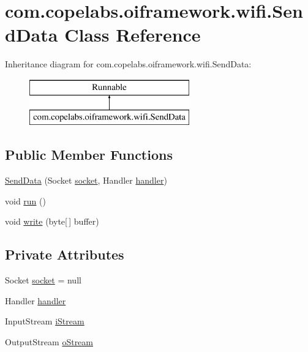 \hypertarget{classcom_1_1copelabs_1_1oiframework_1_1wifi_1_1_send_data}{}\section{com.\+copelabs.\+oiframework.\+wifi.\+Send\+Data Class Reference}
\label{classcom_1_1copelabs_1_1oiframework_1_1wifi_1_1_send_data}
Inheritance diagram for com.\+copelabs.\+oiframework.\+wifi.\+Send\+Data\+:\begin{figure}[H]
\begin{center}
\leavevmode
\includegraphics[height=2.000000cm]{classcom_1_1copelabs_1_1oiframework_1_1wifi_1_1_send_data}
\end{center}
\end{figure}
\subsection*{Public Member Functions}
\begin{DoxyCompactItemize}
\item 
\hyperlink{classcom_1_1copelabs_1_1oiframework_1_1wifi_1_1_send_data_a7313916aaed78662aae8b001a40868d7}{Send\+Data} (Socket \hyperlink{classcom_1_1copelabs_1_1oiframework_1_1wifi_1_1_send_data_aa68cb225ef22bd5e5b057320c8a28c0e}{socket}, Handler \hyperlink{classcom_1_1copelabs_1_1oiframework_1_1wifi_1_1_send_data_a21513ac56025f0efe9e80a1f6b087c2d}{handler})
\item 
void \hyperlink{classcom_1_1copelabs_1_1oiframework_1_1wifi_1_1_send_data_ab7d4fa2454e67ae279a7da9a750b688a}{run} ()
\item 
void \hyperlink{classcom_1_1copelabs_1_1oiframework_1_1wifi_1_1_send_data_a8ecc2a21ec4fd523e962987651be8df9}{write} (byte\mbox{[}$\,$\mbox{]} buffer)
\end{DoxyCompactItemize}
\subsection*{Private Attributes}
\begin{DoxyCompactItemize}
\item 
Socket \hyperlink{classcom_1_1copelabs_1_1oiframework_1_1wifi_1_1_send_data_aa68cb225ef22bd5e5b057320c8a28c0e}{socket} = null
\item 
Handler \hyperlink{classcom_1_1copelabs_1_1oiframework_1_1wifi_1_1_send_data_a21513ac56025f0efe9e80a1f6b087c2d}{handler}
\item 
Input\+Stream \hyperlink{classcom_1_1copelabs_1_1oiframework_1_1wifi_1_1_send_data_aeb2f33e45f684cac0cde3495ddac0a15}{i\+Stream}
\item 
Output\+Stream \hyperlink{classcom_1_1copelabs_1_1oiframework_1_1wifi_1_1_send_data_aa2e24df043ee09164380f1dc9fc20812}{o\+Stream}
\end{DoxyCompactItemize}
